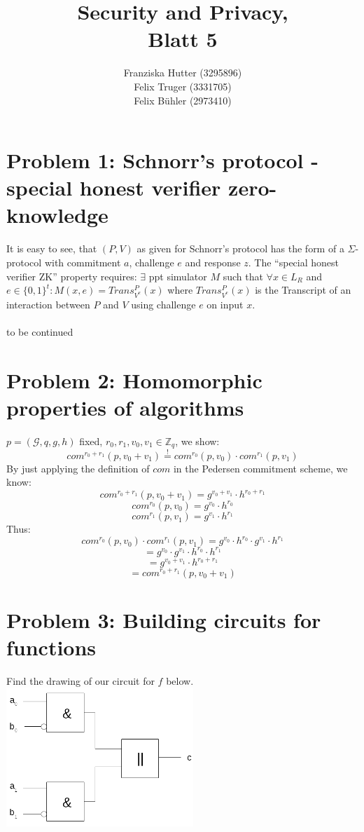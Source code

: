\documentclass[12pt,pdftex,a4paper]{article}
\title{Security and Privacy,\\ Blatt 5}
\author{Franziska Hutter (3295896)\\
	Felix Truger (3331705)\\
	Felix Bühler (2973410)}
\begin{document}
\maketitle
\pagebreak

\section*{Problem 1: Schnorr’s protocol - special honest verifier zero-knowledge}


It is easy to see, that $(P, V)$ as given for Schnorr’s protocol has the form of a $\Sigma$-protocol with commitment $a$, challenge $e$ and response $z$.
The ``special honest verifier ZK'' property requires: $\exists$ ppt simulator $M$ such that $\forall x\in L_R$ and $e\in \{0,1\}^t: M(x, e) = Trans_{V^e}^P(x)$ where $Trans_{V^e}^P(x)$ is the Transcript of an interaction between $P$ and $V$ using challenge $e$ on input $x$.
\\~\\to be continued

\section*{Problem 2: Homomorphic properties of algorithms}
$p=(\mathcal{G},q,g,h)$ fixed, $r_0, r_1, v_0, v_1 \in \mathbb{Z}_q$, we show:
$$com^{r_0+r_1}(p, v_0 + v_1) \overset{!}{=} com^{r_0}(p, v_0) \cdot com^{r_1}(p, v_1)$$
By just applying the definition of $com$ in the Pedersen commitment scheme, we know:
$$com^{r_0+r_1}(p, v_0 + v_1) = g^{v_0 + v_1}\cdot h^{r_0+r_1}$$
$$com^{r_0}(p, v_0) = g^{v_0} \cdot h^{r_0}$$
$$com^{r_1}(p, v_1) = g^{v_1} \cdot h^{r_1}$$
Thus:
$$com^{r_0}(p, v_0) \cdot com^{r_1}(p, v_1) = g^{v_0} \cdot h^{r_0} \cdot g^{v_1} \cdot h^{r_1}$$
$$= g^{v_0}\cdot g^{v_1}\cdot h^{r_0}\cdot h^{r_1}$$
$$= g^{v_0 + v_1}\cdot h^{r_0+r_1}$$
$$= com^{r_0+r_1}(p, v_0 + v_1)$$


\section*{Problem 3: Building circuits for functions}
Find the drawing of our circuit for $f$ below.\\
\includegraphics[width=200pt]{./problem3_binary_circuit.png}
\end{document}
